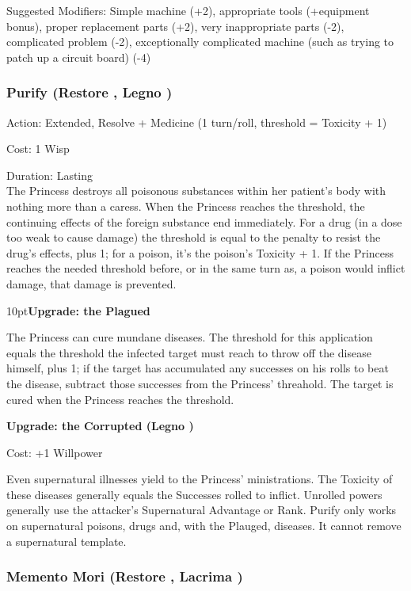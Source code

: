 Suggested Modifiers: Simple machine (+2), appropriate tools (+equipment bonus), proper replacement parts (+2), very inappropriate parts (-2), complicated problem (-2), exceptionally complicated machine (such as trying to patch up a circuit board) (-4)
\subsubsection*{Purify (Restore \textbullet\textbullet, Legno \textbullet)}

\noindent Action: Extended, Resolve + Medicine (1 turn/roll, threshold = Toxicity + 1)

\noindent Cost: 1 Wisp

\noindent Duration: Lasting \\

\noindent The Princess destroys all poisonous substances within her patient's body with nothing more than a caress. When the Princess reaches the threshold, the continuing effects of the foreign substance end immediately. For a drug (in a dose too weak to cause damage) the threshold is equal to the penalty to resist the drug's effects, plus 1; for a poison, it's the poison's Toxicity + 1. If the Princess reaches the needed threshold before, or in the same turn as, a poison would inflict damage, that damage is prevented.
\begin{myindentpar}{10pt}\textbf{Upgrade: the Plagued}

The Princess can cure mundane diseases. The threshold for this application equals the threshold the infected target must reach to throw off the disease himself, plus 1; if the target has accumulated any successes on his rolls to beat the disease, subtract those successes from the Princess' threahold. The target is cured when the Princess reaches the threshold.

\textbf{Upgrade: the Corrupted (Legno  \textbullet\textbullet\textbullet)}

\noindent Cost: +1 Willpower

Even supernatural illnesses yield to the Princess' ministrations. The Toxicity of these diseases generally equals the Successes rolled to inflict. Unrolled powers generally use the attacker's Supernatural Advantage or Rank. Purify only works on supernatural poisons, drugs and, with the Plauged, diseases. It cannot remove a supernatural template.\end{myindentpar}

\subsubsection*{Memento Mori (Restore \textbullet\textbullet, Lacrima \textbullet)}

